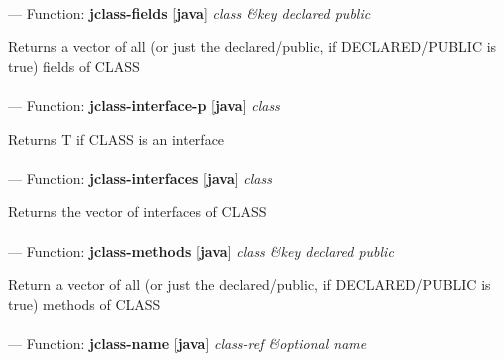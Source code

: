 \paragraph{}
\label{JAVA:JCLASS-FIELDS}
--- Function: \textbf{jclass-fields} [\textbf{java}] \textit{class \&key declared public}

\begin{adjustwidth}{5em}{5em}
Returns a vector of all (or just the declared/public, if DECLARED/PUBLIC is true) fields of CLASS
\end{adjustwidth}

\paragraph{}
\label{JAVA:JCLASS-INTERFACE-P}
--- Function: \textbf{jclass-interface-p} [\textbf{java}] \textit{class}

\begin{adjustwidth}{5em}{5em}
Returns T if CLASS is an interface
\end{adjustwidth}

\paragraph{}
\label{JAVA:JCLASS-INTERFACES}
--- Function: \textbf{jclass-interfaces} [\textbf{java}] \textit{class}

\begin{adjustwidth}{5em}{5em}
Returns the vector of interfaces of CLASS
\end{adjustwidth}

\paragraph{}
\label{JAVA:JCLASS-METHODS}
--- Function: \textbf{jclass-methods} [\textbf{java}] \textit{class \&key declared public}

\begin{adjustwidth}{5em}{5em}
Return a vector of all (or just the declared/public, if DECLARED/PUBLIC is true) methods of CLASS
\end{adjustwidth}

\paragraph{}
\label{JAVA:JCLASS-NAME}
--- Function: \textbf{jclass-name} [\textbf{java}] \textit{class-ref \&optional name}

